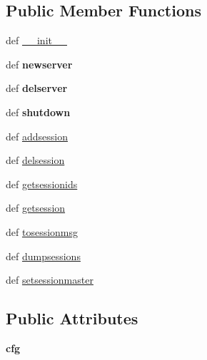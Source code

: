\subsection*{Public Member Functions}
\begin{DoxyCompactItemize}
\item 
def \hyperlink{classcore_1_1coreserver_1_1_core_server_aa8c9d48704308b6c074364cfdaaee6b6}{\+\_\+\+\_\+init\+\_\+\+\_\+}
\item 
\hypertarget{classcore_1_1coreserver_1_1_core_server_a3c2b9ef9347923d9fe899796363ef72b}{def {\bfseries newserver}}\label{classcore_1_1coreserver_1_1_core_server_a3c2b9ef9347923d9fe899796363ef72b}

\item 
\hypertarget{classcore_1_1coreserver_1_1_core_server_ab22231532eaf9b7b19367f256f48ab5f}{def {\bfseries delserver}}\label{classcore_1_1coreserver_1_1_core_server_ab22231532eaf9b7b19367f256f48ab5f}

\item 
\hypertarget{classcore_1_1coreserver_1_1_core_server_ab7d2fe4cb075eb2656b04b6844a507f6}{def {\bfseries shutdown}}\label{classcore_1_1coreserver_1_1_core_server_ab7d2fe4cb075eb2656b04b6844a507f6}

\item 
def \hyperlink{classcore_1_1coreserver_1_1_core_server_a7092d0f0f37f6612dfc8b2723ca52336}{addsession}
\item 
def \hyperlink{classcore_1_1coreserver_1_1_core_server_a68b2b109088a0ae3309c5a99ce5482fd}{delsession}
\item 
def \hyperlink{classcore_1_1coreserver_1_1_core_server_a1a808e019b10fd0c4992e8d532161208}{getsessionids}
\item 
def \hyperlink{classcore_1_1coreserver_1_1_core_server_a3e6792132dadb5b546bf09fa4324c6ca}{getsession}
\item 
def \hyperlink{classcore_1_1coreserver_1_1_core_server_a282e9b79ecf559422291e1b3659b5371}{tosessionmsg}
\item 
def \hyperlink{classcore_1_1coreserver_1_1_core_server_abb084314a55fe1f47791932c246e2551}{dumpsessions}
\item 
def \hyperlink{classcore_1_1coreserver_1_1_core_server_af1d75e42f059926dbd7409ad14b413b8}{setsessionmaster}
\end{DoxyCompactItemize}
\subsection*{Public Attributes}
\begin{DoxyCompactItemize}
\item 
\hypertarget{classcore_1_1coreserver_1_1_core_server_a8a8ecf9a146c1138a2b328bbb0b6dfbe}{{\bfseries cfg}}\label{classcore_1_1coreserver_1_1_core_server_a8a8ecf9a146c1138a2b328bbb0b6dfbe}

\end{DoxyCompactItemize}
